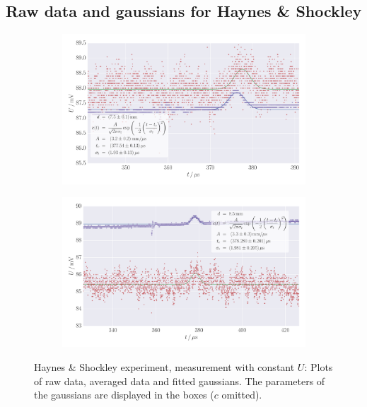 \subsection{Raw data and gaussians for Haynes \& Shockley}
\label{sec:appendix_h_s_plots}
\begin{figure}
    \centering
    \begin{subfigure}[b]{\pltw}
        \includegraphics[width=1.0\linewidth]{figures/haynes_shockley_raw_10}
        \caption{}
        \label{fig:h_s_raw_10}
    \end{subfigure}
    \begin{subfigure}[b]{\pltw}
        \includegraphics[width=1.0\linewidth]{figures/haynes_shockley_raw_12}
        \caption{}
        \label{fig:h_s_raw_12}
    \end{subfigure}
    \caption{
        Haynes \& Shockley experiment, measurement with constant $U$:
        Plots of raw data, averaged data and fitted gaussians. 
        The parameters of the gaussians are displayed in the boxes 
        ($c$ omitted).
        }
    \label{fig:h_s_raw_plots_10_12}
\end{figure}
